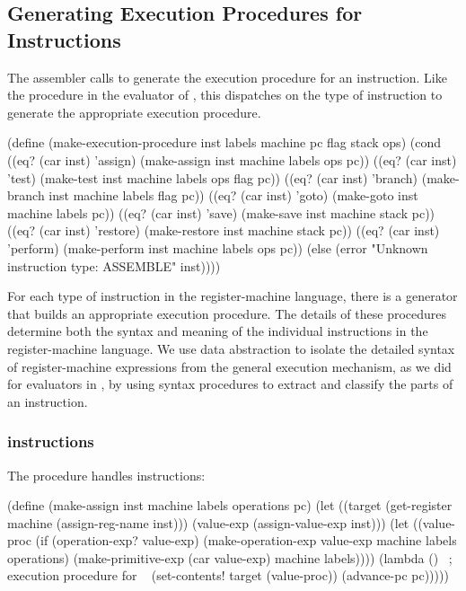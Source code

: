 \subsection{Generating Execution Procedures for Instructions}
\label{Section 5.2.3}

The assembler calls  to generate the execution
procedure for an instruction.  Like the  procedure in the
evaluator of , this dispatches on the type of instruction to
generate the appropriate execution procedure.

\begin{codeBlock}
(define (make-execution-procedure
         inst labels machine pc flag stack ops)
  (cond ((eq? (car inst) 'assign)
         (make-assign inst machine labels ops pc))
        ((eq? (car inst) 'test)
         (make-test inst machine labels ops flag pc))
        ((eq? (car inst) 'branch)
         (make-branch inst machine labels flag pc))
        ((eq? (car inst) 'goto)
         (make-goto inst machine labels pc))
        ((eq? (car inst) 'save)
         (make-save inst machine stack pc))
        ((eq? (car inst) 'restore)
         (make-restore inst machine stack pc))
        ((eq? (car inst) 'perform)
         (make-perform inst machine labels ops pc))
        (else
         (error "Unknown instruction type: ASSEMBLE"
                inst))))
\end{codeBlock}

\noindent
For each type of instruction in the register-machine language, there is a
generator that builds an appropriate execution procedure.  The details of these
procedures determine both the syntax and meaning of the individual instructions
in the register-machine language.  We use data abstraction to isolate the
detailed syntax of register-machine expressions from the general execution
mechanism, as we did for evaluators in , by using syntax
procedures to extract and classify the parts of an instruction.

\subsubsection*{ instructions}

The  procedure handles  instructions:

\begin{codeBlock}
(define (make-assign inst machine labels operations pc)
  (let ((target
         (get-register machine (assign-reg-name inst)))
        (value-exp (assign-value-exp inst)))
    (let ((value-proc
           (if (operation-exp? value-exp)
               (make-operation-exp
                value-exp machine labels operations)
               (make-primitive-exp
                (car value-exp) machine labels))))
      (lambda ()   ~\textrm{; execution procedure for }~
        (set-contents! target (value-proc))
        (advance-pc pc)))))
\end{codeBlock}

